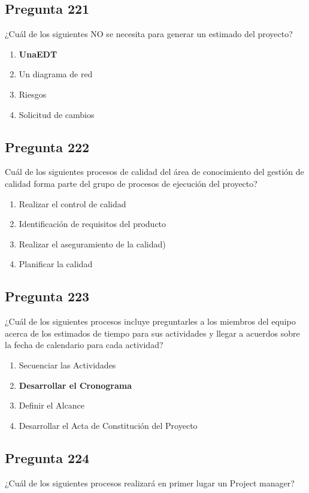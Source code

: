 \documentclass[11pt,a4paper]{article}
\begin{document}
\subsection*{Pregunta 221}
¿Cuál de los siguientes NO se necesita para generar un estimado del proyecto?

\begin{enumerate}[label=\alph*)]
  \item \textbf{UnaEDT}
  \item Un diagrama de red
  \item Riesgos
  \item Solicitud de cambios
\end{enumerate}

\subsection*{Pregunta 222}
Cuál de los siguientes procesos de calidad del área de conocimiento del gestión de calidad forma parte del grupo de procesos de ejecución del proyecto?

\begin{enumerate}[label=\alph*)]
  \item Realizar el control de calidad
  \item Identificación de requisitos del producto
  \item Realizar el aseguramiento de la calidad)
  \item Planificar la calidad
\end{enumerate}

\subsection*{Pregunta 223}
¿Cuál de los siguientes procesos incluye preguntarles a los miembros del equipo acerca de los estimados de tiempo para sus actividades y llegar a acuerdos sobre la fecha de calendario para cada actividad?

\begin{enumerate}[label=\alph*)]
  \item Secuenciar las Actividades
  \item \textbf{Desarrollar el Cronograma}
  \item Definir el Alcance
  \item Desarrollar el Acta de Constitución del Proyecto
\end{enumerate}

\subsection*{Pregunta 224}
¿Cuál de los siguientes procesos realizará en primer lugar un Project manager?
\end{document}
